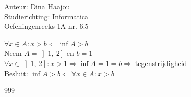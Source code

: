 \documentclass[a4paper]{article}
\begin{document}
\noindent \large Auteur: Dina Haajou \\
\noindent \large Studierichting: Informatica \\
\noindent \large Oefeningenreeks 1A nr. 6.5 \\

\medskip

\normalsize

$ \forall x \in A : x > b \Leftarrow \inf A > b $ \\

Neem $A = \left]1,\ 2\right]$ en $b = 1$ \\

$ \forall x \in \left]1,\ 2\right] : x > 1 \Rightarrow \inf A = 1 = b \Rightarrow$ tegenstrijdigheid \\

Besluit: $ \inf A > b \Leftarrow \forall x \in A : x > b $

\begin{thebibliography}{999}
\end{thebibliography}
\end{document}
